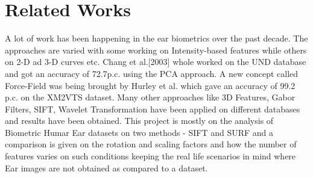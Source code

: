 \chapter{Related Works}
\label{sec:related}

A lot of work has been happening in the ear biometrics over the past decade. The approaches are varied with some working on Intensity-based features while others on 2-D ad 3-D curves etc. Chang et al.[2003] whole worked on the UND database and got an accuracy of 72.7p.c. using the PCA approach. A new concept called Force-Field was being brought by Hurley et al. which gave an accuracy of 99.2 p.c. on the XM2VTS dataset. Many other approaches like 3D Features, Gabor Filters, SIFT, Wavelet Transformation have been applied on different databases and results have been obtained. This project is mostly on the analysis of Biometric Humar Ear datasets on two methods - SIFT and SURF and a comparison is given on the rotation and scaling factors and how the number of features varies on such conditions keeping the real life scenarios in mind where Ear images are not obtained as compared to a dataset.

